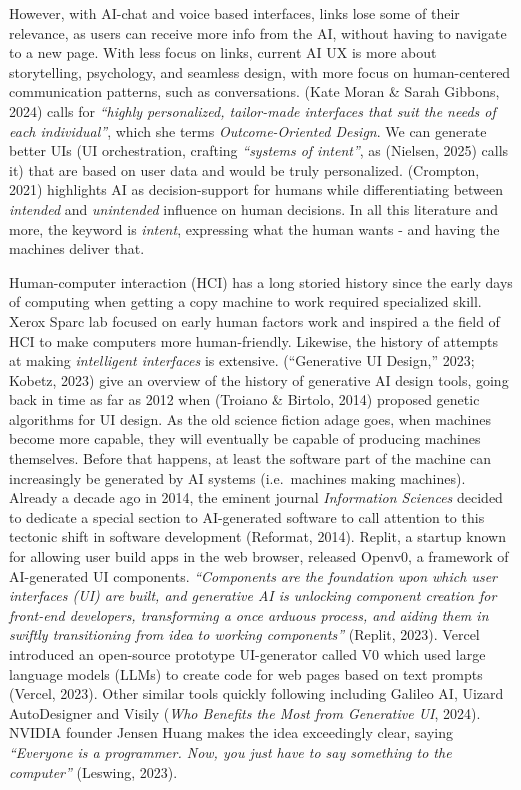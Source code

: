 \documentclass[
  12pt,
  letterpaper,
  DIV=11,
  numbers=noendperiod]{scrartcl}
\begin{document}
However, with AI-chat and voice based interfaces, links lose some of
their relevance, as users can receive more info from the AI, without
having to navigate to a new page. With less focus on links, current AI
UX is more about storytelling, psychology, and seamless design, with
more focus on human-centered communication patterns, such as
conversations. (Kate Moran \& Sarah Gibbons, 2024) calls for
\emph{``highly personalized, tailor-made interfaces that suit the needs
of each individual''}, which she terms \emph{Outcome-Oriented Design}.
We can generate better UIs (UI orchestration, crafting \emph{``systems
of intent''}, as (Nielsen, 2025) calls it) that are based on user data
and would be truly personalized. (Crompton, 2021) highlights AI as
decision-support for humans while differentiating between
\emph{intended} and \emph{unintended} influence on human decisions. In
all this literature and more, the keyword is \emph{intent}, expressing
what the human wants - and having the machines deliver that.

Human-computer interaction (HCI) has a long storied history since the
early days of computing when getting a copy machine to work required
specialized skill. Xerox Sparc lab focused on early human factors work
and inspired a the field of HCI to make computers more human-friendly.
Likewise, the history of attempts at making \emph{intelligent
interfaces} is extensive. ({``Generative {UI Design},''} 2023; Kobetz,
2023) give an overview of the history of generative AI design tools,
going back in time as far as 2012 when (Troiano \& Birtolo, 2014)
proposed genetic algorithms for UI design. As the old science fiction
adage goes, when machines become more capable, they will eventually be
capable of producing machines themselves. Before that happens, at least
the software part of the machine can increasingly be generated by AI
systems (i.e.~machines making machines). Already a decade ago in 2014,
the eminent journal \emph{Information Sciences} decided to dedicate a
special section to AI-generated software to call attention to this
tectonic shift in software development (Reformat, 2014). Replit, a
startup known for allowing user build apps in the web browser, released
Openv0, a framework of AI-generated UI components. \emph{``Components
are the foundation upon which user interfaces (UI) are built, and
generative AI is unlocking component creation for front-end developers,
transforming a once arduous process, and aiding them in swiftly
transitioning from idea to working components''} (Replit, 2023). Vercel
introduced an open-source prototype UI-generator called V0 which used
large language models (LLMs) to create code for web pages based on text
prompts (Vercel, 2023). Other similar tools quickly following including
Galileo AI, Uizard AutoDesigner and Visily (\emph{Who {Benefits} the
Most from {Generative UI}}, 2024). NVIDIA founder Jensen Huang makes the
idea exceedingly clear, saying \emph{``Everyone is a programmer. Now,
you just have to say something to the computer''} (Leswing, 2023).
\end{document}
